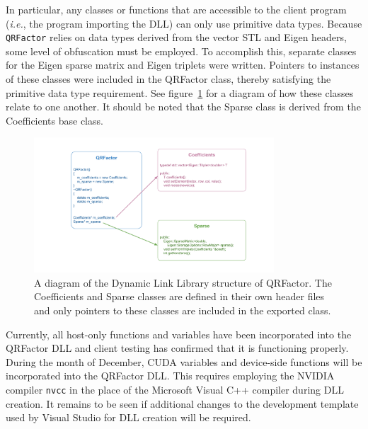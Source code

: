\documentclass[11pt,letterpaper]{article}
\newcommand{\qrf}{\texttt{QRFactor}}
\begin{document}
In particular, any classes or functions that are accessible to the client program ({\it i.e.}, the program importing the DLL) can only use primitive data types. Because \qrf\! relies on data types derived from the vector STL and Eigen headers, some level of obfuscation must be employed. To accomplish this, separate classes for the Eigen sparse matrix and Eigen triplets were written. Pointers to instances of these classes were included in the QRFactor class, thereby satisfying the primitive data type requirement. See figure~\ref{fig: class diagram} for a diagram of how these classes relate to one another. It should be noted that the Sparse class is derived from the Coefficients base class.

\begin{figure}[h]
    \centering
    \includegraphics[width=0.8\textwidth]{QRFactorLib_Diagram.pdf}
    \caption{A diagram of the Dynamic Link Library structure of QRFactor. The Coefficients and Sparse classes are defined in their own header files and only pointers to these classes are included in the exported class.}
    \label{fig: class diagram}
\end{figure}

Currently, all host-only functions and variables have been incorporated into the QRFactor DLL and client testing has confirmed that it is functioning properly. During the month of December, CUDA variables and device-side functions will be incorporated into the QRFactor DLL. This requires employing the NVIDIA compiler \verb+nvcc+ in the place of the Microsoft Visual C++ compiler during DLL creation. It remains to be seen if additional changes to the development template used by Visual Studio for DLL creation will be required.

\appendix
\section*{}
\end{document}
